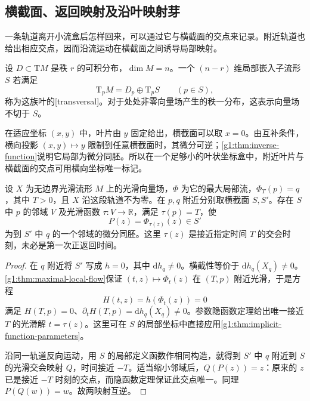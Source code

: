 \subsection{横截面、返回映射及沿叶映射芽}
\label{g1:subsec:1305:02}

一条轨道离开小流盒后怎样回来，可以通过它与横截面的交点来记录。附近轨道也给出相应交点，因而沿流运动在横截面之间诱导局部映射。

\begin{definition}
	\label{g1:def:foliation-transversal}
	设 \(D\subset \mathrm{T}M\) 是秩 \(r\) 的可积分布，\(\dim M=n\)。一个 \((n-r)\) 维局部嵌入子流形 \(S\) 若满足
	\[
		\mathrm{T}_pM=D_p\oplus \mathrm{T}_pS\qquad(p\in S),
	\]
	称为这族叶的[transversal]。对于处处非零向量场产生的秩一分布，这表示向量场不切于 \(S\)。
\end{definition}

在适应坐标 \((x,y)\) 中，叶片由 \(y\) 固定给出，横截面可以取 \(x=0\)。由互补条件，横向投影 \((x,y)\mapsto y\) 限制到任意横截面时，其微分可逆；\cref{g1:thm:inverse-function}说明它局部为微分同胚。所以在一个足够小的叶状坐标盒中，附近叶片与横截面的交点可用横向坐标唯一标记。

\begin{proposition}
	\label{g1:prop:local-return-map}
	设 \(X\) 为无边界光滑流形 \(M\) 上的光滑向量场，\(\Phi\) 为它的最大局部流，\(\Phi_T(p)=q\)，其中 \(T>0\)，且 \(X\) 沿这段轨道不为零。在 \(p,q\) 附近分别取横截面 \(S,S'\)。存在 \(S\) 中 \(p\) 的邻域 \(V\) 及光滑函数 \(\tau:V\to\mathbb R\)，满足 \(\tau(p)=T\)，使
	\[
		P(z)=\Phi_{\tau(z)}(z)\in S'
	\]
	为到 \(S'\) 中 \(q\) 的一个邻域的微分同胚。这里 \(\tau(z)\) 是接近指定时间 \(T\) 的交会时刻，未必是第一次正返回时间。
\end{proposition}
\begin{proof}
	在 \(q\) 附近将 \(S'\) 写成 \(h=0\)，其中 \(\mathrm{d}h_q\neq0\)。横截性等价于 \(\mathrm{d}h_q(X_q)\neq0\)。\cref{g1:thm:maximal-local-flow}保证 \((t,z)\mapsto\Phi_t(z)\) 在 \((T,p)\) 附近光滑，于是方程
	\[
		H(t,z)=h(\Phi_t(z))=0
	\]
	满足 \(H(T,p)=0\)、\(\partial_tH(T,p)=\mathrm{d}h_q(X_q)\neq0\)。参数隐函数定理给出唯一接近 \(T\) 的光滑解 \(t=\tau(z)\)。这里可在 \(S\) 的局部坐标中直接应用\cref{g1:thm:implicit-function-parameters}。

	沿同一轨道反向运动，用 \(S\) 的局部定义函数作相同构造，就得到 \(S'\) 中 \(q\) 附近到 \(S\) 的光滑交会映射 \(Q\)，时间接近 \(-T\)。适当缩小邻域后，\(Q(P(z))=z\)：原来的 \(z\) 已是接近 \(-T\) 时刻的交点，而隐函数定理保证此交点唯一。同理 \(P(Q(w))=w\)。故两映射互逆。
\end{proof}

